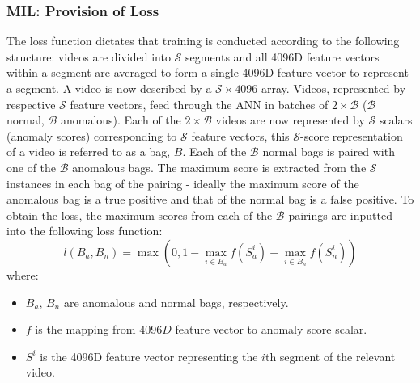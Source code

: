 \documentclass[sigplan,authorversion,nonacm, 9pt]{acmart}
\begin{document}
\subsubsection{MIL: Provision of Loss} \label{sec:milloss}
The loss function dictates that training is conducted according to the following structure:
videos are divided into $\mathcal{S}$ segments and all 4096D feature vectors within a segment are averaged to form a single 4096D feature vector to represent a segment. A video is now described by a $\mathcal{S} \times 4096$ array. Videos, represented by respective $\mathcal{S}$ feature vectors, feed through the ANN in batches of $2\times\mathcal{B}$ ($\mathcal{B}$ normal, $\mathcal{B}$ anomalous). Each of the $2\times\mathcal{B}$ videos are now represented by $\mathcal{S}$ scalars (anomaly scores) corresponding to $\mathcal{S}$ feature vectors, this $\mathcal{S}$-score representation of a video is referred to as a bag, $B$. Each of the $\mathcal{B}$ normal bags is paired with one of the $\mathcal{B}$ anomalous bags. The maximum score is extracted from the $\mathcal{S}$ instances in each bag of the pairing - ideally the maximum score of the anomalous bag is a true positive and that of the normal bag is a false positive. To obtain the loss, the maximum scores from each of the $\mathcal{B}$ pairings are inputted into the following loss function:
\begin{equation}
    l(B_a, B_n) = \max (0, 1 - \max_{i \in B_a} f(S_{a}^{i}) + \max_{i \in B_n} f(S_{n}^{i}) )
\end{equation}
where:
\begin{itemize}
    \item[] $B_a$, $B_n$ are anomalous and normal bags, respectively. 
    \item[] $f$ is the mapping from $4096D$ feature vector to anomaly score scalar. 
    \item[] $S^{i}$ is the 4096D feature vector representing the $i$th segment of the relevant video.
\end{itemize}
\end{document}
